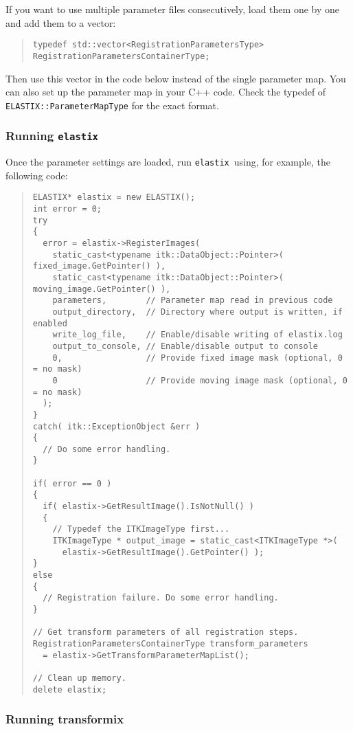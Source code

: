 \documentclass[]{report}
\newcommand{\elastix}{\texttt{elastix}}
\begin{document}
If you want to use multiple parameter files consecutively, load them
one by one and add them to a vector:
\begin{quote}
\begin{verbatim}
typedef std::vector<RegistrationParametersType> RegistrationParametersContainerType;
\end{verbatim}
\end{quote}
Then use this vector in the code below instead of the single
parameter map. You can also set up the parameter map in your C++
code. Check the typedef of \texttt{ELASTIX::ParameterMapType} for
the exact format.

\subsubsection{Running \elastix}

Once the parameter settings are loaded, run \elastix\ using, for
example, the following code:
\begin{quote}
\begin{verbatim}
ELASTIX* elastix = new ELASTIX();
int error = 0;
try
{
  error = elastix->RegisterImages(
    static_cast<typename itk::DataObject::Pointer>( fixed_image.GetPointer() ),
    static_cast<typename itk::DataObject::Pointer>( moving_image.GetPointer() ),
    parameters,        // Parameter map read in previous code
    output_directory,  // Directory where output is written, if enabled
    write_log_file,    // Enable/disable writing of elastix.log
    output_to_console, // Enable/disable output to console
    0,                 // Provide fixed image mask (optional, 0 = no mask)
    0                  // Provide moving image mask (optional, 0 = no mask)
  );
}
catch( itk::ExceptionObject &err )
{
  // Do some error handling.
}

if( error == 0 )
{
  if( elastix->GetResultImage().IsNotNull() )
  {
    // Typedef the ITKImageType first...
    ITKImageType * output_image = static_cast<ITKImageType *>(
      elastix->GetResultImage().GetPointer() );
}
else
{
  // Registration failure. Do some error handling.
}

// Get transform parameters of all registration steps.
RegistrationParametersContainerType transform_parameters
  = elastix->GetTransformParameterMapList();

// Clean up memory.
delete elastix;
\end{verbatim}
\end{quote}

\subsubsection{Running transformix}
\end{document}
